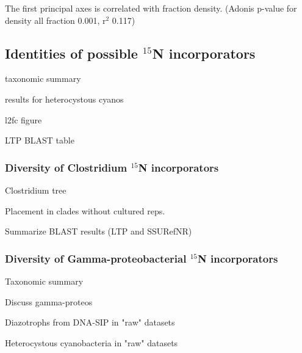 The first principal axes is correlated with fraction density. (Adonis p-value for density all fraction 0.001, r$^{2}$ 0.117)

\subsection{Identities of possible $^{15}$N incorporators}

taxonomic summary

results for heterocystous cyanos

l2fc figure

LTP BLAST table

\subsubsection{Diversity of Clostridium $^{15}$N incorporators}

Clostridium tree

Placement in clades without cultured reps.

Summarize BLAST results (LTP and SSURefNR)

\subsubsection{Diversity of Gamma-proteobacterial $^{15}$N incorporators}

Taxonomic summary

Discuss gamma-proteos

Diazotrophs from DNA-SIP in "raw" datasets

Heterocystous cyanobacteria in "raw" datasets



